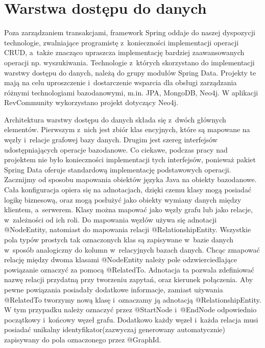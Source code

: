 \section{Warstwa dostępu do danych}

Poza zarządzaniem transakcjami, framework Spring oddaje do naszej dyspozycji technologie, zwalniające programistę z~konieczności implementacji operacji CRUD, a~także znacząco upraszcza implementację bardziej zaawansowanych operacji np. wyszukiwania. Technologie z~których skorzystano do implementacji warstwy dostępu do danych, należą do grupy modułów Spring Data. Projekty te mają na celu uproszczenie i~dostarczenie wsparcia dla obsługi zarządzania różnymi technologiami bazodanowymi, m.in. JPA, MongoDB, Neo4j. W aplikacji RevCommunity wykorzystano projekt dotyczący Neo4j.

Architektura warstwy dostępu do danych składa się z~dwóch głównych elementów. Pierwszym z~nich jest zbiór klas encyjnych, które są mapowane na węzły i~relacje grafowej bazy danych. Drugim jest szereg interfejsów udostępniających operacje bazodanowe. Co ciekawe, podczas pracy nad projektem nie było konieczności implementacji tych interfejsów, ponieważ pakiet Spring Data oferuje standardową implementację podstawowych operacji. Zacznijmy od sposobu mapowania obiektów języka Java na obiekty bazodanowe. Cała konfiguracja opiera się na adnotacjach, dzięki czemu klasy mogą posiadać logikę biznesową, oraz mogą posłużyć jako obiekty wymiany danych między klientem, a~serwerem. Klasy można mapować jako węzły grafu lub jako relacje, w~zależności od ich roli. Do mapowania węzłów używa się adnotacji @NodeEntity, natomiast do mapowania relacji @RelationshipEntity. Wszystkie pola typów prostych tak oznaczonych klas są zapisywane w~bazie danych w~sposób analogiczny do kolumn w~relacyjnych bazach danych. Chcąc zmapować relację między dwoma klasami @NodeEntity należy pole odzwierciedlające powiązanie oznaczyć za pomocą @RelatedTo. Adnotacja ta pozwala zdefiniować nazwę relacji przydatną przy tworzeniu zapytań, oraz kierunek połączenia. Aby pewne powiązania posiadały dodatkowe informacje, zamiast używania @RelatedTo tworzymy nową klasę i~oznaczamy ją adnotacją @RelationshipEntity. W tym przypadku należy oznaczyć przez @StartNode i~@EndNode odpowiednio początkowy i~końcowy węzeł grafu. Dodatkowo każdy węzeł i~każda relacja musi posiadać unikalny identyfikator(zazwyczaj generowany automatycznie) zapisywany do pola oznaczonego przez @GraphId. 


